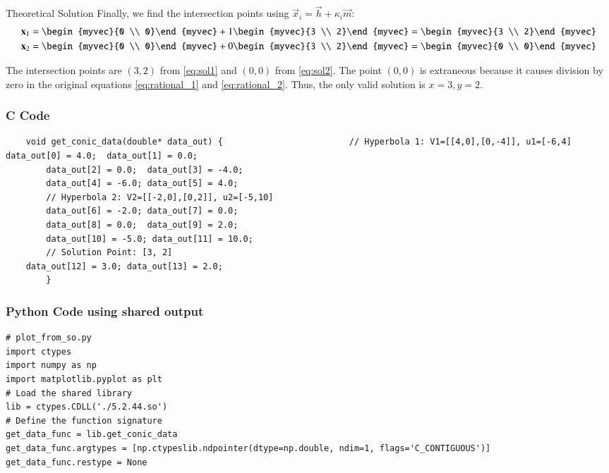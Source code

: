 \documentclass{beamer}
\begin{document}
	\begin{frame}{Theoretical Solution}
			Finally, we find the intersection points using $\vec{x}_i = \vec{h} + \kappa_i\vec{m}$:
		\begin{align}
			\vec{x}_1 &= \begin{myvec}{0 \\ 0}\end{myvec} + 1 \begin{myvec}{3 \\ 2}\end{myvec} = \begin{myvec}{3 \\ 2}\end{myvec} \label{eq:sol1} \\
			\vec{x}_2 &= \begin{myvec}{0 \\ 0}\end{myvec} + 0 \begin{myvec}{3 \\ 2}\end{myvec} = \begin{myvec}{0 \\ 0}\end{myvec} \label{eq:sol2}
		\end{align}
		
		The intersection points are $(3,2)$ from \eqref{eq:sol1} and $(0,0)$ from \eqref{eq:sol2}. The point $(0,0)$ is extraneous because it causes division by zero in the original equations \eqref{eq:rational_1} and \eqref{eq:rational_2}. Thus, the only valid solution is $x=3, y=2$.
		
	\end{frame}
	\begin{frame}[fragile]
		\frametitle{C Code}
		
		\begin{lstlisting}
	void get_conic_data(double* data_out) {							// Hyperbola 1: V1=[[4,0],[0,-4]], u1=[-6,4]			data_out[0] = 4.0;  data_out[1] = 0.0;
		data_out[2] = 0.0;  data_out[3] = -4.0;
		data_out[4] = -6.0; data_out[5] = 4.0;
		// Hyperbola 2: V2=[[-2,0],[0,2]], u2=[-5,10]
		data_out[6] = -2.0; data_out[7] = 0.0;
		data_out[8] = 0.0;  data_out[9] = 2.0;
		data_out[10] = -5.0; data_out[11] = 10.0;
		// Solution Point: [3, 2]
	data_out[12] = 3.0; data_out[13] = 2.0;
		}
		\end{lstlisting}
	\end{frame}
	\begin{frame}[fragile]
		\frametitle{Python Code using shared output}
		
		\begin{lstlisting}
# plot_from_so.py
import ctypes
import numpy as np
import matplotlib.pyplot as plt
# Load the shared library
lib = ctypes.CDLL('./5.2.44.so')
# Define the function signature
get_data_func = lib.get_conic_data
get_data_func.argtypes = [np.ctypeslib.ndpointer(dtype=np.double, ndim=1, flags='C_CONTIGUOUS')]
get_data_func.restype = None		
		\end{lstlisting}
	\end{frame}
\end{document}
